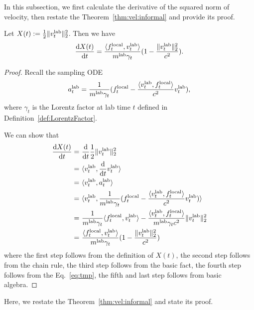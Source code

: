 In this subsection, we first calculate the derivative of the squared norm of velocity, then restate the Theorem~\ref{thm:vel:informal} and provide its proof.

\begin{lemma}\label{lem:velocity_derivative}
    Let $X(t) := \frac{1}{2}\|v_t^{\rm lab}\|_2^2$. Then we have
    \begin{align*}
        \frac{\mathrm{d} X(t)}{\mathrm{d} t} = \frac{ \langle f_t^{\rm local}, v_t^{\rm lab} \rangle}{m^{\rm lab} \gamma_t}(1 - \frac{\|v_t^{\rm lab}\|_2^2}{c^2}). 
    \end{align*}
\end{lemma}
\begin{proof}
Recall the sampling ODE
\begin{align}\label{eq:tmp}
    a_t^{\rm lab} = \frac{1}{m^{\rm lab} \gamma_t}(f_t^{\rm local} - \frac{\langle v_t^{\rm lab}, f_t^{\rm local} \rangle}{c^2} v_t^{\rm lab}),
\end{align}
where $\gamma_t$ is the Lorentz factor at lab time $t$ defined in Definition~\ref{def:LorentzFactor}.

We can show that
\begin{align*}
    \frac{\mathrm{d} X(t)}{\mathrm{d} t} = &~ \frac{\mathrm{d}}{\mathrm{d} t} \frac{1}{2}\|v_t^{\rm lab} \|_2^2 \\
    = &~ \langle v_t^{\rm lab}, \frac{\mathrm{d}}{\mathrm{d} t} v_t^{\rm lab} \rangle \\
    = &~ \langle v_t^{\rm lab}, a_t^{\rm lab} \rangle \\
    = &~ \langle v_t^{\rm lab}, \frac{1}{m^{\rm lab} \gamma_t}(f_t^{\rm local} - \frac{\langle v_t^{\rm lab}, f_t^{\rm local} \rangle}{c^2} v_t^{\rm lab}) \rangle \\
    = &~ \frac{1}{m^{\rm lab} \gamma_t} \langle f_t^{\rm local}, v_t^{\rm lab} \rangle - \frac{\langle v_t^{\rm lab}, f_t^{\rm local} \rangle}{m^{\rm lab} \gamma_t c^2} \| v_t^{\rm lab} \|_2^2 \\
    = &~ \frac{ \langle f_t^{\rm local}, v_t^{\rm lab} \rangle}{m^{\rm lab} \gamma_t}(1 - \frac{\|v_t^{\rm lab}\|_2^2}{c^2}) 
\end{align*}
where the first step follows from the definition of $X(t)$, the second step follows from the chain rule, the third step follows from the basic fact, the fourth step follows from the Eq.~\eqref{eq:tmp}, the fifth and last step follows from basic algebra.
\end{proof}

Here, we restate the Theorem~\ref{thm:vel:informal} and state its proof.

